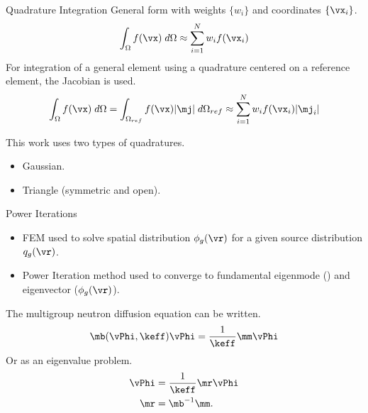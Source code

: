 \begin{frame}{Quadrature Integration}
  General form with weights $\{w_i\}$ and coordinates $\{\vx_i\}$.
  \begin{equation}
    \label{eq:quadrature}
    \int_{\Omega} f(\vx) \;d\Omega \approx \sum_{i=1}^{N} w_i f(\vx_i)
  \end{equation}
  For integration of a general element using a quadrature centered on a
  reference element, the Jacobian is used.
  \begin{equation}
    \int_{\Omega} f(\vx) \;d\Omega = 
      \int_{\Omega_{ref}} f(\vx) \lvert \mj \rvert \;d\Omega_{ref} \approx
      \sum_{i=1}^{N} w_i f(\vx_i) \lvert \mj_i \rvert
  \end{equation}

  This work uses two types of quadratures.
  \begin{itemize}
    \item Gaussian.
    \item Triangle (symmetric and open).
  \end{itemize}
\end{frame}

\begin{frame}{Power Iterations}
  \begin{itemize}
    \item FEM used to solve spatial distribution $\phi_g(\vr)$ for a given
      source distribution $q_g(\vr)$.
    \item Power Iteration method used to converge to fundamental eigenmode
      (\keff) and eigenvector ($\phi_g(\vr)$).
  \end{itemize}

  The multigroup neutron diffusion equation can be written.
  \begin{equation}
    \label{eq:gehin_notation}
    \mb(\vPhi,\keff) \vPhi = \frac{1}{\keff} \mm \vPhi
  \end{equation}
  Or as an eigenvalue problem.
  \begin{align}
    \label{eq:gehin_solution}
    \vPhi &= \frac{1}{\keff} \mr \vPhi \\
    \label{eq:gehin_r}
    \mr &= \mb^{-1} \mm.
  \end{align}
\end{frame}

